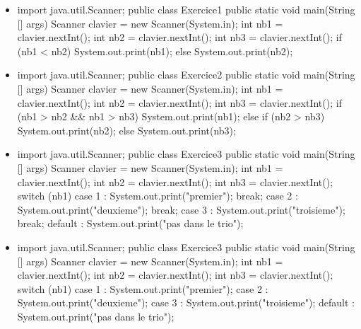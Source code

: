 \documentclass[11pt,a4paper]{article}
\begin{document}
\begin{itemize}
			\item \begin{Java}
import java.util.Scanner;
public class Exercice1 {
    public static void main(String [] args) {
        Scanner clavier = new Scanner(System.in);
        int nb1 = clavier.nextInt();
        int nb2 = clavier.nextInt();
        int nb3 = clavier.nextInt();
        if (nb1 < nb2){
          System.out.print(nb1);
        } else {
          System.out.print(nb2);
        } 
    }
}
        \end{Java} \textcolor{gray}{\underline{\hspace*{1em}}} 
			\item \begin{Java}
import java.util.Scanner;
public class Exercice2 {
    public static void main(String [] args) {
        Scanner clavier = new Scanner(System.in);
        int nb1 = clavier.nextInt();
        int nb2 = clavier.nextInt();
        int nb3 = clavier.nextInt();
        if (nb1 > nb2 && nb1 > nb3){
          System.out.print(nb1);
        } else {
            if (nb2 > nb3){
              System.out.print(nb2);
            } else {
              System.out.print(nb3);
            }
        } 
    }
}
        \end{Java} \textcolor{gray}{\underline{\hspace*{1em}}} 
			\item \begin{Java}
import java.util.Scanner;
public class Exercice3 {
    public static void main(String [] args) {
        Scanner clavier = new Scanner(System.in);
        int nb1 = clavier.nextInt();
        int nb2 = clavier.nextInt();
        int nb3 = clavier.nextInt();
        switch (nb1){
          case 1 : System.out.print("premier"); break;
          case 2 : System.out.print("deuxieme"); break;
          case 3 : System.out.print("troisieme"); break;
          default : System.out.print("pas dans le trio");
        } 
    }
}
        \end{Java} \textcolor{gray}{\underline{\hspace*{10em}}} 
			\item \begin{Java}
import java.util.Scanner;
public class Exercice3 {
    public static void main(String [] args) {
        Scanner clavier = new Scanner(System.in);
        int nb1 = clavier.nextInt();
        int nb2 = clavier.nextInt();
        int nb3 = clavier.nextInt();
        switch (nb1){
          case 1 : System.out.print("premier");
          case 2 : System.out.print("deuxieme");
          case 3 : System.out.print("troisieme");
          default : System.out.print("pas dans le trio");
        } 
    }
}
        \end{Java} \textcolor{gray}{\underline{\hspace*{20em}}} 
					\end{itemize}
				
\end{document}
